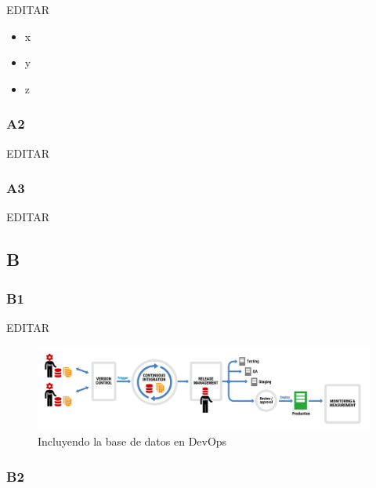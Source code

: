 \documentclass[preprint,12pt]{elsarticle}
\begin{document}
EDITAR\\

\cite{Gartner} 


\begin{itemize}
	\item x
	\item y
	\item z
\end{itemize}

\subsubsection{\textbf{A2}}

EDITAR\\

\subsubsection{\textbf{A3}}

EDITAR\\



\subsection{\textbf{B}}

\subsubsection{\textbf{B1}}

EDITAR\\

\begin{figure}[htb]
	\begin{center}
		\includegraphics[width=14cm]{./IMAGENES/basededatos_1} 
		\caption{Incluyendo la base de datos en DevOps}
	\end{center}
\end{figure}

\subsubsection{\textbf{B2}}
\end{document}
